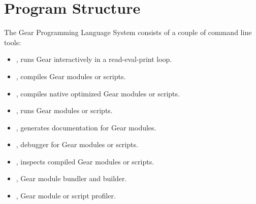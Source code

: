 
\chapter{Program Structure}
\label{sec:program-structure}

The Gear Programming Language System consists of a couple of command line tools: 
\begin{itemize}
  \item {}, runs Gear interactively in a read-eval-print loop.
  \item {}, compiles Gear modules or scripts.
  \item {}, compiles native optimized Gear modules or scripts.
  \item {}, runs Gear modules or scripts.
  \item {}, generates documentation for Gear modules. 
  \item {}, debugger for Gear modules or scripts. 
  \item {}, inspects compiled Gear modules or scripts.
  \item {}, Gear module bundler and builder.
  \item {}, Gear module or script profiler.
\end{itemize}


